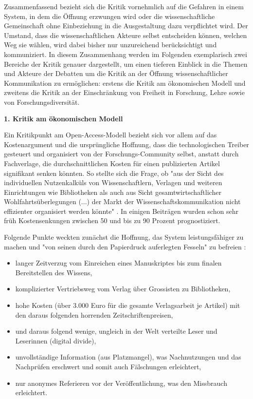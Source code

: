 Zusammenfassend bezieht sich die Kritik vornehmlich auf die Gefahren in einem System, in dem die Öffnung erzwungen wird oder die wissenschaftliche Gemeinschaft ohne Einbeziehung in die Ausgestaltung dazu verpflichtet wird. Der Umstand, dass die wissenschaftlichen Akteure selbst entscheiden können, welchen Weg sie wählen, wird dabei bisher nur unzureichend berücksichtigt und kommuniziert. In diesem Zusammenhang werden im Folgenden exemplarisch zwei Bereiche der Kritik genauer dargestellt, um einen tieferen Einblick in die Themen und Akteure der Debatten um die Kritik an der Öffnung wissenschaftlicher Kommunikation zu ermöglichen: erstens die Kritik am ökonomischen Modell und zweitens die Kritik an der Einschränkung von Freiheit in Forschung, Lehre sowie von Forschungsdiversität.

\textbf{1. Kritik am ökonomischen Modell}

Ein Kritikpunkt am Open-Access-Modell bezieht sich vor allem auf das Kostenargument und die ursprüngliche Hoffnung, dass die technologischen Treiber gesteuert und organisiert von der Forschungs-Community selbst, anstatt durch Fachverlage, die durchschnittlichen Kosten für einen publizierten Artikel signifikant senken könnten. So stellte sich die Frage, ob "aus der Sicht des individuellen Nutzenkalküls von Wissenschaftlern, Verlagen und weiteren Einrichtungen wie Bibliotheken als auch aus Sicht gesamtwirtschaftlicher Wohlfahrtsüberlegungen (...) der Markt der Wissenschaftskommunikation nicht effizienter organisiert werden könnte" \cite{Hess_2006}. In einigen Beiträgen wurden schon sehr früh Kostensenkungen zwischen 50 und bis zu 90 Prozent \cite{Hilf_2004} \cite[:64]{Willinsky_2006} prognostiziert.

Folgende Punkte weckten zunächst die Hoffnung, das System leistungsfähiger zu machen und "von seinen durch den Papierdruck auferlegten Fesseln" zu befreien \cite{Hilf_2004}:
\begin{itemize}
\item langer Zeitverzug vom Einreichen eines Manuskriptes bis zum finalen Bereitstellen des Wissens,
\item komplizierter Vertriebsweg vom Verlag über Grossisten zu Bibliotheken,
\item hohe Kosten (über 3.000 Euro für die gesamte Verlagsarbeit je Artikel) mit den daraus folgenden horrenden Zeitschriftenpreisen,
\item und daraus folgend wenige, ungleich in der Welt verteilte Leser und Leserinnen (digital divide),
\item unvollständige Information (aus Platzmangel), was Nachnutzungen und das Nachprüfen erschwert und somit auch Fälschungen erleichtert,
\item nur anonymes Referieren vor der Veröffentlichung, was den Missbrauch erleichtert.
\end{itemize}

